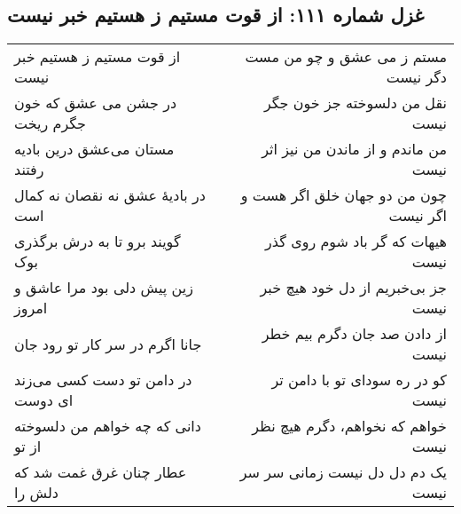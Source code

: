 \begin{center}
\section*{غزل شماره ۱۱۱: از قوت مستیم ز هستیم خبر نیست}
\label{sec:111}
\begin{longtable}{l p{0.5cm} r}
از قوت مستیم ز هستیم خبر نیست
&&
مستم ز می عشق و چو من مست دگر نیست
\\
در جشن می عشق که خون جگرم ریخت
&&
نقل من دلسوخته جز خون جگر نیست
\\
مستان می‌عشق درین بادیه رفتند
&&
من ماندم و از ماندن من نیز اثر نیست
\\
در بادیهٔ عشق نه نقصان نه کمال است
&&
چون من دو جهان خلق اگر هست و اگر نیست
\\
گویند برو تا به درش برگذری بوک
&&
هیهات که گر باد شوم روی گذر نیست
\\
زین پیش دلی بود مرا عاشق و امروز
&&
جز بی‌خبریم از دل خود هیچ خبر نیست
\\
جانا اگرم در سر کار تو رود جان
&&
از دادن صد جان دگرم بیم خطر نیست
\\
در دامن تو دست کسی می‌زند ای دوست
&&
کو در ره سودای تو با دامن تر نیست
\\
دانی که چه خواهم من دلسوخته از تو
&&
خواهم که نخواهم، دگرم هیچ نظر نیست
\\
عطار چنان غرق غمت شد که دلش را
&&
یک دم دل دل نیست زمانی سر سر نیست
\\
\end{longtable}
\end{center}
